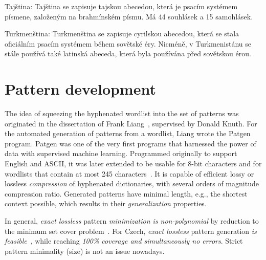\documentclass{csbulletin}
\let\stress=\emph
\let\program=\textrm %
\providecommand\ASCII{ASCII\xspace}
\newcommand{\Patgen}{\program{Patgen}\xspace}
\begin{document}
Tajština: Tajština se zapisuje tajskou abecedou, která je psacím systémem písmene, založeným na brahmínském písmu. Má 44 souhlásek a 15 samohlásek.

Turkmenština: Turkmenština se zapisuje cyrilskou abecedou, která se stala oficiálním psacím systémem během sovětské éry. Nicméně, v Turkmenistánu se stále používá také latinská abeceda, která byla používána před sovětskou érou.
\fi


\section{Pattern development}
\label{sec:patterns}

The idea of squeezing the hyphenated wordlist into the set of patterns was originated  in the dissertation of Frank Liang~\cite{tex:Liang83:thesis}, supervised by Donald Knuth.
For the automated generation of patterns from a wordlist, Liang wrote the \Patgen program.
\Patgen was one of the very first programs that harnessed the power of data with supervised machine learning. 
Programmed originally to support English and \ASCII, it was later extended to be usable for 8-bit characters and for wordlists that contain at most 245 characters~\cite{tex:patgen99}.
It is capable of efficient lossy or lossless \stress{compression} of hyphenated dictionaries, with several orders of magnitude compression ratio.
Generated patterns have minimal length, e.g., the shortest context possible, which results in their \stress{generalization} properties.
    
In general, \stress{exact lossless} pattern \stress{minimization is non-polynomial} by reduction to the minimum set cover problem~\cite{nlp:Sojka2005:thesis}.
For Czech, \stress{exact lossless} pattern generation \stress{is feasible}~\cite{tex:sojkas2019unreasonable}, while reaching \stress{100\% coverage \emph{and simultaneously} no errors}.
Strict pattern minimality (size) is not an issue nowadays.
\end{document}
